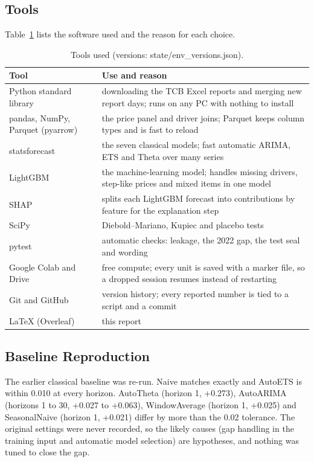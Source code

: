 \documentclass[12pt]{report}
\begin{document}
\subsection{Tools}
Table~\ref{tab:tools} lists the software used and the reason for each choice.
\begin{table}[H]\centering\small
\caption{Tools used (versions: state/env\_versions.json).}\label{tab:tools}
\begin{tabular}{p{4.2cm}p{9.2cm}}
\toprule
Tool & Use and reason \\ \midrule
Python standard library & downloading the TCB Excel reports and merging new report days; runs on any PC with nothing to install \\
pandas, NumPy, Parquet (pyarrow) & the price panel and driver joins; Parquet keeps column types and is fast to reload \\
statsforecast & the seven classical models; fast automatic ARIMA, ETS and Theta over many series \\
LightGBM & the machine-learning model; handles missing drivers, step-like prices and mixed items in one model \\
SHAP & splits each LightGBM forecast into contributions by feature for the explanation step \\
SciPy & Diebold--Mariano, Kupiec and placebo tests \\
pytest & automatic checks: leakage, the 2022 gap, the test seal and wording \\
Google Colab and Drive & free compute; every unit is saved with a marker file, so a dropped session resumes instead of restarting \\
Git and GitHub & version history; every reported number is tied to a script and a commit \\
\LaTeX{} (Overleaf) & this report \\
\bottomrule
\end{tabular}
\end{table}

\subsection{Baseline Reproduction}
The earlier classical baseline was re-run. Naive matches exactly and AutoETS is within 0.010 at every horizon. AutoTheta (horizon 1, +0.273), AutoARIMA (horizons 1 to 30, +0.027 to +0.063), WindowAverage (horizon 1, +0.025) and SeasonalNaive (horizon 1, +0.021) differ by more than the 0.02 tolerance. The original settings were never recorded, so the likely causes (gap handling in the training input and automatic model selection) are hypotheses, and nothing was tuned to close the gap.
\end{document}

